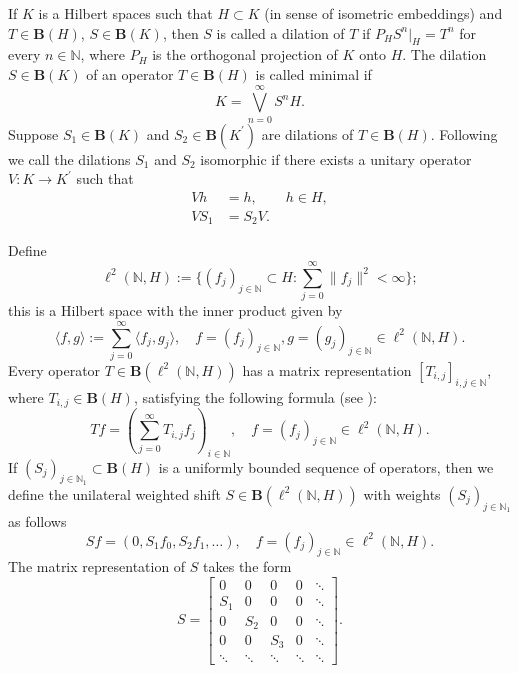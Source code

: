 \documentclass{amsart}
\theoremstyle{definition}
\numberwithin{equation}{section}
\begin{document}
If $ K $ is a  Hilbert spaces such that $ H\subset K $ (in sense of isometric embeddings) and $ T\in \mathbf{B}(H) $, $ S\in \mathbf{B}(K) $, then $ S $ is called a dilation of $ T $ if $ P_{H}S^{n}|_{H} = T^{n} $ for every $ n\in \mathbb{N} $, where $ P_{H} $ is the orthogonal projection of $ K $ onto $ H $. The dilation $ S\in \mathbf{B}(K) $ of an operator $ T\in \mathbf{B}(H) $ is called minimal if 
\begin{equation*}
    K = \bigvee_{n=0}^{\infty} S^{n}H.
\end{equation*}
Suppose $ S_{1}\in \mathbf{B}(K) $ and $ S_{2}\in \mathbf{B}(K^{\prime}) $ are dilations of $ T\in \mathbf{B}(H) $. Following \cite[Chapter I]{SzNagyHarmonicAnalysisOfOperators} we call the dilations $ S_{1} $ and $ S_{2} $ isomorphic if there exists a unitary operator $ V\colon K\to K^{\prime} $ such that
\begin{align*}
    Vh &= h, \qquad h\in H,\\
    VS_{1} &= S_{2}V. 
\end{align*}\par
Define
\begin{equation*}
    \ell^{2}(\mathbb{N},H) := \{(f_{j})_{j\in \mathbb{N}}\subset H\colon \sum_{j=0}^{\infty} \lVert f_{j}\rVert^{2} < \infty \};
\end{equation*}
this is a Hilbert space with the inner product given by
\begin{equation*}
    \langle f,g\rangle := \sum_{j=0}^{\infty} \langle f_{j},g_{j}\rangle, \quad f = (f_{j})_{j\in \mathbb{N}},g = (g_{j})_{j\in \mathbb{N}} \in \ell^{2}(\mathbb{N},H).
\end{equation*}
Every operator $ T\in \mathbf{B}(\ell^{2}(\mathbb{N},H)) $ has a matrix representation $ [T_{i,j}]_{i,j\in \mathbb{N}} $, where $ T_{i,j}\in \mathbf{B}(H) $, satisfying the following formula (see \cite[Chapter 8]{halmosHilbertSpaceProblemBook}):
\begin{equation*}
    Tf = \left( \sum_{j=0}^{\infty} T_{i,j} f_{j} \right)_{i\in \mathbb{N}}, \quad f = (f_{j})_{j\in \mathbb{N}} \in \ell^{2}(\mathbb{N},H).
\end{equation*}
If $ (S_{j})_{j\in \mathbb{N}_{1}}\subset \mathbf{B}(H) $ is a uniformly bounded sequence of operators, then we define the unilateral weighted shift $ S\in \mathbf{B}(\ell^{2}(\mathbb{N},H)) $ with weights $ (S_{j})_{j\in \mathbb{N}_{1}} $ as follows
\begin{equation*}
    Sf = (0,S_{1}f_{0},S_{2}f_{1},\ldots), \quad f=(f_{j})_{j\in \mathbb{N}} \in \ell^{2}(\mathbb{N},H).
\end{equation*}
The matrix representation of $ S $ takes the form
\begin{equation*}
    S = \begin{bmatrix}
        0 & 0 & 0 & 0 & \ddots\\
        S_{1} & 0 & 0 & 0 & \ddots \\
        0 & S_{2} & 0 & 0 & \ddots\\
        0 & 0 & S_{3} & 0 & \ddots\\
        \ddots & \ddots & \ddots & \ddots & \ddots
    \end{bmatrix}.
\end{equation*}
\end{document}
